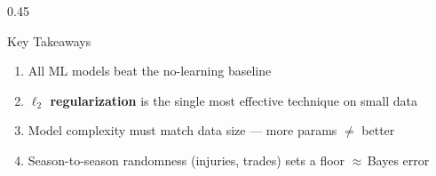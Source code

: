 \documentclass{beamer}
\begin{document}
\begin{frame}[t]
\begin{columns}[T]
\begin{column}{0.45\textwidth}
\begin{block}{\scriptsize Key Takeaways}
\vspace{-2pt}
{\scriptsize
\begin{enumerate}
  \setlength{\itemsep}{2pt}
  \item All ML models beat the no-learning baseline
  \item \textbf{$\ell_2$ regularization}
    {\tiny\color{gray}} is the single
    most effective technique on small data
  \item Model complexity must match data size ---
    more params $\neq$ better
    {\tiny\color{gray}}
  \item Season-to-season randomness (injuries, trades)
    sets a floor $\approx$\,Bayes error
    {\tiny\color{gray}}
\end{enumerate}
}
\vspace{-2pt}
\end{block}
\end{column}

\end{columns}

\end{frame}
\end{document}
